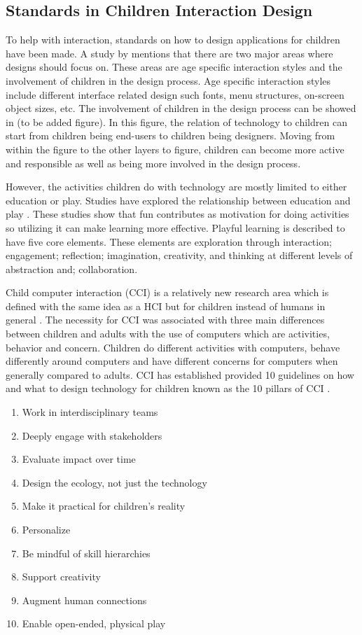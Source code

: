 \subsection{Standards in Children Interaction Design}

To help with interaction, standards on how to design applications for children have been made. A study by \cite{markopoulos2003interaction} mentions that there are two major areas where designs should focus on. These areas are age specific interaction styles and the involvement of children in the design process. Age specific interaction styles include different interface related design such fonts, menu structures, on-screen object sizes, etc. The involvement of children in the design process can be showed in (to be added figure). In this figure, the relation of technology to children can start from children being end-users to children being designers. Moving from within the figure to the other layers to figure, children can become more active and responsible as well as being more involved in the design process.

However, the activities children do with technology are mostly limited to either education or play. Studies have explored the relationship between education and play \cite{markopoulos2003interaction}. These studies show that fun contributes as motivation for doing activities so utilizing it can make learning more effective. Playful learning is described to have five core elements. These elements are exploration through interaction; engagement; reflection; imagination, creativity, and thinking at different levels of abstraction and; collaboration.

Child computer interaction (CCI) is a relatively new research area which is defined with the same idea as a HCI but for children instead of humans in general \cite{read2011nature}. The necessity for CCI was associated with three main differences between children and adults with the use of computers which are activities, behavior and concern. Children do different activities with computers, behave differently around computers and have different concerns for computers when generally compared to adults. CCI has established provided 10 guidelines on how and what to design technology for children known as the 10 pillars of CCI \cite{hourcade2015child}.

\begin{enumerate} 
\item Work in interdisciplinary teams
\item Deeply engage with stakeholders
\item Evaluate impact over time
\item Design the ecology, not just the technology
\item Make it practical for children’s reality
\item Personalize
\item Be mindful of skill hierarchies
\item Support creativity
\item Augment human connections
\item Enable open-ended, physical play
\end{enumerate}

